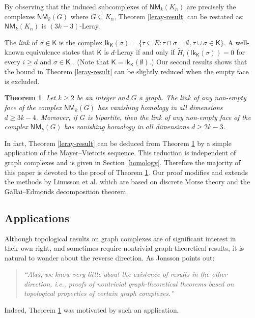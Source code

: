 \documentclass[10pt]{amsart}
\newcommand{\lk}{\mathsf{lk}}
\newcommand{\NM}{\mathsf{NM}}
\newtheorem{thm}{Theorem}[section]
\theoremstyle{definition}
\begin{document}
	By observing that 
	the induced subcomplexes of $\mathsf{NM}_k(K_n)$ are precisely the complexes $\mathsf{NM}_k(G)$ where $G\subseteq K_n$,  Theorem \ref{leray-result} can be restated as: $\mathsf{NM}_k(K_n)$ is $(3k-3)$-Leray.
	
	The {\em link} of $\sigma \in \mathsf{K}$ is the complex $\lk_\mathsf{K}(\sigma) = \{\tau\subseteq E : \tau\cap \sigma =\emptyset, \tau\cup \sigma \in \mathsf{K}\}$. A well-known equivalence states that $\mathsf{K}$ is $d$-Leray if and only if $\tilde{H}_i(\lk_\mathsf{K}(\sigma)) = 0$ for every $i\geq d$ and $\sigma\in \mathsf{K}$ \cite[Proposition 3.1]{kalai-meshulam2}. (Note that $\mathsf{K} = \lk_\mathsf{K}(\emptyset)$.) Our second results shows that 
	the bound in Theorem \ref{leray-result} can be slightly reduced when the empty face is excluded.
	
	\begin{thm} \label{link-result}
		Let $k\geq 2$ be an integer and $G$ a graph.
		The link of any non-empty face of the complex $\NM_k(G)$ has vanishing homology in all dimensions $d\geq 3k-4$. Moreover, if $G$ is bipartite, then the link of any non-empty face of the complex $\NM_k(G)$ has vanishing homology in all dimensions $d\geq 2k-3$.
	\end{thm}
	
	In fact, Theorem \ref{leray-result} can be deduced from Theorem \ref{link-result} by a simple application of the Mayer--Vietoris sequence. This reduction is independent of graph complexes and is given in Section \ref{homology}. Therefore the majority of this paper is devoted to the proof of Theorem \ref{link-result}. Our proof modifies and extends the methods by Linusson et al. \cite{linusson_bounded_matching_complex} which are based on discrete Morse theory and the Gallai--Edmonds decomposition theorem.
	
	\subsection{Applications} Although topological results on graph complexes are of significant interest in their own right, and sometimes
	require nontrivial graph-theoretical results, it is natural to wonder about the reverse direction. As Jonsson points out:
	\begin{quote}
		\textit{``Alas, we know very little about the existence of results in the other direction, i.e., proofs of nontrivial graph-theoretical theorems based on topological properties of certain graph complexes." \cite[page 13]{jonsson_complex_graph}}
	\end{quote}
	Indeed, Theorem \ref{link-result} was motivated by such an application. 
	
\end{document}
